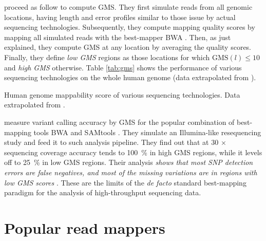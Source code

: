 \citeauthor{Lee2012} proceed as follow to compute GMS.
They first simulate reads from all genomic locations, having length and error profiles similar to those issue by actual sequencing technologies.
Subsequently, they compute mapping quality scores by mapping all simulated reads with the best-mapper BWA \citep{Li2009}.
Then, as just explained, they compute GMS at any location by averaging the quality scores.
Finally, they define \emph{low GMS} regions as those locations for which $\text{GMS}(l) \leq 10$ and \emph{high GMS} otherwise.
Table \ref{tab:gms} shows the performance of various sequencing technologies on the whole human genome (data extrapolated from \citep{Lee2012}).

\begin{table}[h]
\begin{center}
\caption[Human genome mappability score]{Human genome mappability score of various sequencing technologies. Data extrapolated from \citep{Lee2012}.}
\sffamily

\label{tab:gms}
\end{center}
\end{table}

\citeauthor{Lee2012} measure variant calling accuracy by GMS for the popular combination of best-mapping tools BWA and SAMtools \citep{Li2009a}.
They simulate an Illumina-like resequencing study and feed it to such analysis pipeline.
They find out that at $30\,\times$ sequencing coverage accuracy tends to 100~\% in high GMS regions, while it levels off to 25~\% in low GMS regions.
Their analysis \emph{shows that most SNP detection errors are false negatives, and most of the missing variations are in regions with low GMS scores} \citep{Lee2012}.
These are the limits of the \emph{de facto} standard best-mapping paradigm for the analysis of high-throughput sequencing data.



\section{Popular read mappers}

